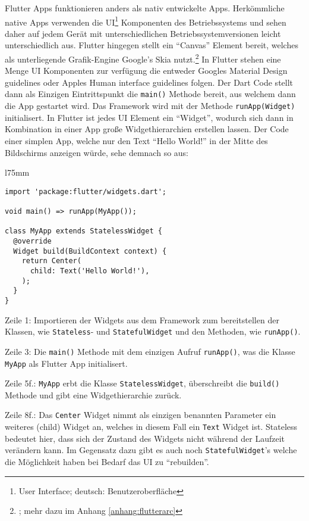 Flutter Apps funktionieren anders als nativ entwickelte Apps. Herkömmliche native Apps verwenden die UI\footnote{User Interface; deutsch: Benutzeroberfläche} Komponenten des Betriebssystems und sehen daher auf jedem Gerät mit unterschiedlichen Betriebssystemversionen leicht unterschiedlich aus. Flutter hingegen stellt ein "`Canvas"' Element bereit, welches als unterliegende Grafik-Engine Google's Skia nutzt.\footnote{\cite{flutterarchitecture}; mehr dazu im Anhang \ref{anhang:flutterarc}} In Flutter stehen eine Menge UI Komponenten zur verfügung die entweder Googles Material Design guidelines oder Apples Human interface guidelines folgen. Der Dart Code stellt dann als Einzigen Eintrittspunkt die \texttt{main()} Methode bereit, aus welchem dann die App gestartet wird. Das Framework wird mit der Methode \texttt{runApp(Widget)} initialisert. In Flutter ist jedes UI Element ein "`Widget"', wodurch sich dann in Kombination in einer App große Widgethierarchien erstellen lassen. Der Code einer simplen App, welche nur den Text "`Hello World!"' in der Mitte des Bildschirms anzeigen würde, sehe demnach so aus:

\begin{wrapfigure}{l}{75mm}
  \begin{verbatim}
import 'package:flutter/widgets.dart';

void main() => runApp(MyApp());

class MyApp extends StatelessWidget {
  @override
  Widget build(BuildContext context) {
    return Center(
      child: Text('Hello World!'),
    );
  }
}
\end{verbatim}
\end{wrapfigure}

Zeile 1: Importieren der Widgets aus dem Framework zum bereitstellen der Klassen, wie \texttt{Stateless}- und \texttt{StatefulWidget} und den Methoden, wie \texttt{runApp()}.

Zeile 3: Die \texttt{main()} Methode mit dem einzigen Aufruf \texttt{runApp()}, was die Klasse \texttt{MyApp} als Flutter App initialisert.

Zeile 5f.: \texttt{MyApp} erbt die Klasse \texttt{StatelessWidget}, überschreibt die \texttt{build()} Methode und gibt eine Widgethierarchie zurück.

Zeile 8f.: Das \texttt{Center} Widget nimmt als einzigen benannten Parameter ein weiteres (child) Widget an, welches in diesem Fall ein \texttt{Text} Widget ist. Stateless bedeutet hier, dass sich der Zustand des Widgets nicht während der Laufzeit verändern kann. Im Gegensatz dazu gibt es auch noch \texttt{StatefulWidget}'s welche die Möglichkeit haben bei Bedarf das UI zu "`rebuilden"'.

